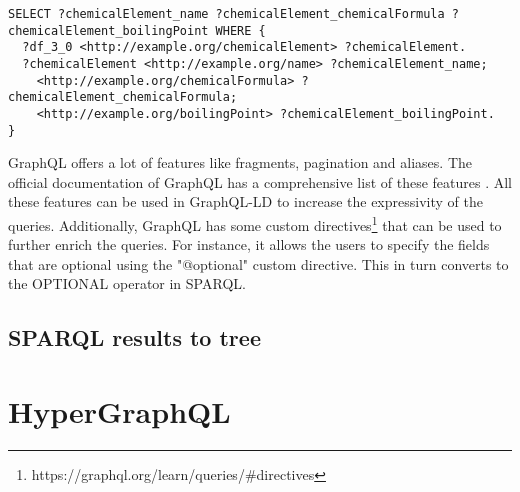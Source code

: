\begin{minipage}{\linewidth}
\begin{lstlisting}[label=listing:listing9, caption={Genertaed SPARQL query}]
SELECT ?chemicalElement_name ?chemicalElement_chemicalFormula ?chemicalElement_boilingPoint WHERE {
  ?df_3_0 <http://example.org/chemicalElement> ?chemicalElement.
  ?chemicalElement <http://example.org/name> ?chemicalElement_name;
    <http://example.org/chemicalFormula> ?chemicalElement_chemicalFormula;
    <http://example.org/boilingPoint> ?chemicalElement_boilingPoint.
}
\end{lstlisting}
\end{minipage}

GraphQL offers a lot of features like fragments, pagination and aliases. The official documentation of GraphQL has a comprehensive list of these features \cite{GraphQL}. All these features can be used in GraphQL-LD to increase the expressivity of the queries. Additionally, GraphQL has some custom directives\footnote{https://graphql.org/learn/queries/\#directives} that can be used to further enrich the queries. For instance, it allows the users to specify the fields that are optional using the "@optional" custom directive. This in turn converts to the OPTIONAL operator in SPARQL. 

\subsection{SPARQL results to tree}

\section{HyperGraphQL}

